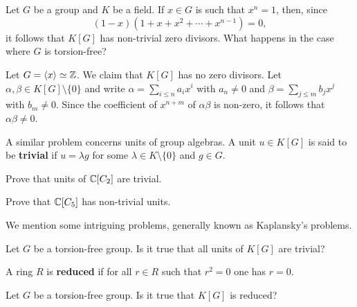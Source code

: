\chapter{}


Let $G$ be a group and $K$ be a field. If  
$x\in G$ is such that $x^n=1$, then, since 
\[
(1-x)(1+x+x^2+\cdots+x^{n-1})=0, 
\] 
it follows that $K[G]$ has non-trivial zero divisors. What happens in the case
where $G$ is torsion-free?

\begin{example}
	\label{example:k[Z]}
	Let $G=\langle x\rangle\simeq\mathbb{Z}$. We claim that $K[G]$ has no zero divisors. 
	Let $\alpha,\beta\in K[G]\setminus\{0\}$ and write 
	$\alpha=\sum_{i\leq n}a_ix^i$ with $a_n\ne 0$ and $\beta=\sum_{j\leq m}b_jx^j$
	with $b_m\ne 0$. Since the coefficient of $x^{n+m}$ of $\alpha\beta$ is non-zero,
	it follows that 
	$\alpha\beta\ne 0$.
\end{example}

A similar problem concerns units of group algebras.  A unit $u\in K[G]$ is said
to be \textbf{trivial} if $u=\lambda g$ for some $\lambda\in K\setminus\{0\}$ and
$g\in G$.	

\begin{exercise}
	Prove that units of $\mathbb{C}[C_2]$ are trivial. 
\end{exercise}

\begin{exercise}
	Prove that $\mathbb{C}[C_5]$ has non-trivial units. 
\end{exercise}


We mention some intriguing problems, generally known as Kaplansky's problems. 

\begin{problem}[Units]
	\label{prob:units}
	Let $G$ be a torsion-free group. Is it true that all units of $K[G]$ are
	trivial?
\end{problem}

A ring $R$ is \textbf{reduced} if for all $r\in R$ such that 
$r^2=0$ one has $r=0$. 

\begin{problem}
	\label{prob:reducido}
	Let $G$ be a torsion-free group. Is it true that 
	$K[G]$ is reduced? 
\end{problem}


